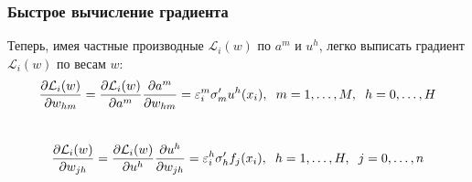 \documentclass[12pt]{beamer}
\begin{document}
\begin{frame}\frametitle{Быстрое вычисление градиента}
Теперь, имея частные производные $\mathcal{L}_i(w)$ по $a^m$ и $u^h$, легко выписать градиент $\mathcal{L}_i(w)$ по весам $w$:\\

$$\frac {\partial \mathcal{L}_i(w)}{\partial w_{hm}} = \frac {\partial \mathcal{L}_i(w)}{\partial a^m} \frac {\partial a^m}{\partial w_{hm}} = \varepsilon^m_i \sigma'_m u^h(x_i), \hspace{2mm} m = 1,\dots,M, \hspace{2mm} h = 0,\dots, H$$\\

$$\frac {\partial \mathcal{L}_i(w)}{\partial w_{jh}} = \frac {\partial \mathcal{L}_i(w)}{\partial u^h} \frac {\partial u^h}{\partial w_{jh}} = \varepsilon_i^h \sigma'_h f_j(x_i), \hspace{2mm} h = 1,\dots,H, \hspace{2mm} j = 0,\dots, n$$ \\

\end{frame}
\end{document}

